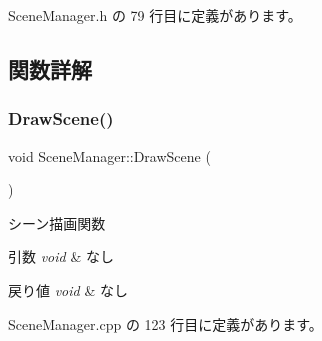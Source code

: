  Scene\+Manager.\+h の 79 行目に定義があります。



\subsection{関数詳解}
\mbox{\label{class_scene_manager_a828b35826f757b8af34aa767c6b40378}} 
\subsubsection{\texorpdfstring{Draw\+Scene()}{DrawScene()}}
{\footnotesize\ttfamily void Scene\+Manager\+::\+Draw\+Scene (\begin{DoxyParamCaption}{ }\end{DoxyParamCaption})}



シーン描画関数 


\begin{DoxyParams}{引数}
{\em void} & なし \\
\hline
\end{DoxyParams}

\begin{DoxyRetVals}{戻り値}
{\em void} & なし \\
\hline
\end{DoxyRetVals}


 Scene\+Manager.\+cpp の 123 行目に定義があります。

